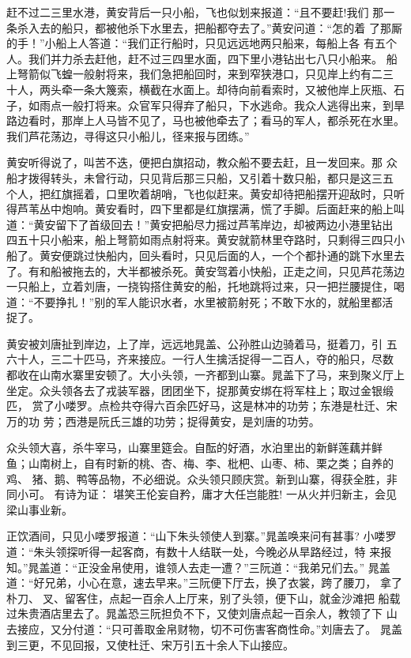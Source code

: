 赶不过二三里水港，黄安背后一只小船，飞也似划来报道：“且不要赶!我们
那一条杀入去的船只，都被他杀下水里去，把船都夺去了。”黄安问道：“怎的着
了那厮的手！”小船上人答道：“我们正行船时，只见远远地两只船来，每船上各
有五个人。我们并力杀去赶他，赶不过三四里水面，四下里小港钻出七八只小船来。
船上弩箭似飞蝗一般射将来，我们急把船回时，来到窄狭港口，只见岸上约有二三
十人，两头牵一条大篾索，横截在水面上。却待向前看索时，又被他岸上灰瓶、石
子，如雨点一般打将来。众官军只得弃了船只，下水逃命。我众人逃得出来，到旱
路边看时，那岸上人马皆不见了，马也被他牵去了；看马的军人，都杀死在水里。
我们芦花荡边，寻得这只小船儿，径来报与团练。”

黄安听得说了，叫苦不迭，便把白旗招动，教众船不要去赶，且一发回来。那
众船才拨得转头，未曾行动，只见背后那三只船，又引着十数只船，都只是这三五
个人，把红旗摇着，口里吹着胡哨，飞也似赶来。黄安却待把船摆开迎敌时，只听
得芦苇丛中炮响。黄安看时，四下里都是红旗摆满，慌了手脚。后面赶来的船上叫
道：“黄安留下了首级回去！”黄安把船尽力摇过芦苇岸边，却被两边小港里钻出
四五十只小船来，船上弩箭如雨点射将来。黄安就箭林里夺路时，只剩得三四只小
船了。黄安便跳过快船内，回头看时，只见后面的人，一个个都扑通的跳下水里去
了。有和船被拖去的，大半都被杀死。黄安驾着小快船，正走之间，只见芦花荡边
一只船上，立着刘唐，一挠钩搭住黄安的船，托地跳将过来，只一把拦腰提住，喝
道：“不要挣扎！”别的军人能识水者，水里被箭射死；不敢下水的，就船里都活
捉了。

黄安被刘唐扯到岸边，上了岸，远远地晁盖、公孙胜山边骑着马，挺着刀，引
五六十人，三二十匹马，齐来接应。一行人生擒活捉得一二百人，夺的船只，尽数
都收在山南水寨里安顿了。大小头领，一齐都到山寨。晁盖下了马，来到聚义厅上
坐定。众头领各去了戎装军器，团团坐下，捉那黄安绑在将军柱上；取过金银缎匹，
赏了小喽罗。点检共夺得六百余匹好马，这是林冲的功劳；东港是杜迁、宋万的功
劳；西港是阮氏三雄的功劳；捉得黄安，是刘唐的功劳。

众头领大喜，杀牛宰马，山寨里筵会。自酝的好酒，水泊里出的新鲜莲藕并鲜
鱼；山南树上，自有时新的桃、杏、梅、李、枇杷、山枣、柿、栗之类；自养的鸡、
猪、鹅、鸭等品物，不必细说。众头领只顾庆赏。新到山寨，得获全胜，非同小可。
有诗为证：
堪笑王伦妄自矜，庸才大任岂能胜!
一从火并归新主，会见梁山事业新。

正饮酒间，只见小喽罗报道：“山下朱头领使人到寨。”晁盖唤来问有甚事?
小喽罗道：“朱头领探听得一起客商，有数十人结联一处，今晚必从旱路经过，特
来报知。”晁盖道：“正没金帛使用，谁领人去走一遭？”三阮道：“我弟兄们去。”
晁盖道：“好兄弟，小心在意，速去早来。”三阮便下厅去，换了衣裳，跨了腰刀，
拿了朴刀、叉、留客住，点起一百余人上厅来，别了头领，便下山，就金沙滩把
船载过朱贵酒店里去了。晁盖恐三阮担负不下，又使刘唐点起一百余人，教领了下
山去接应，又分付道：“只可善取金帛财物，切不可伤害客商性命。”刘唐去了。
晁盖到三更，不见回报，又使杜迁、宋万引五十余人下山接应。

